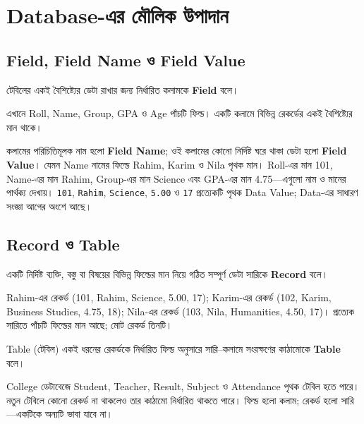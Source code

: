 \section{Database-এর মৌলিক উপাদান}
\subsection{Field, Field Name ও Field Value}
\begin{definitionbox}{}
টেবিলের একই বৈশিষ্ট্যের ডেটা রাখার জন্য নির্ধারিত কলামকে \textbf{Field} বলে।
\end{definitionbox}


এখানে Roll, Name, Group, GPA ও Age পাঁচটি ফিল্ড। একটি কলামে বিভিন্ন রেকর্ডের একই বৈশিষ্ট্যের মান থাকে।

কলামের পরিচিতিমূলক নাম হলো \textbf{Field Name}; ওই কলামের কোনো নির্দিষ্ট ঘরে থাকা ডেটা হলো \textbf{Field Value}। যেমন Name নামের ফিল্ডে Rahim, Karim ও Nila পৃথক মান। Roll-এর মান 101, Name-এর মান Rahim, Group-এর মান Science এবং GPA-এর মান 4.75—এগুলো নাম ও মানের পার্থক্য দেখায়। \texttt{101}, \texttt{Rahim}, \texttt{Science}, \texttt{5.00} ও \texttt{17} প্রত্যেকটি পৃথক Data Value; Data-এর সাধারণ সংজ্ঞা আগের অংশে আছে।

\subsection{Record ও Table}
\begin{definitionbox}{}
একটি নির্দিষ্ট ব্যক্তি, বস্তু বা বিষয়ের বিভিন্ন ফিল্ডের মান নিয়ে গঠিত সম্পূর্ণ ডেটা সারিকে \textbf{Record} বলে।
\end{definitionbox}
Rahim-এর রেকর্ড (101, Rahim, Science, 5.00, 17); Karim-এর রেকর্ড (102, Karim, Business Studies, 4.75, 18); Nila-এর রেকর্ড (103, Nila, Humanities, 4.50, 17)। প্রত্যেক সারিতে পাঁচটি ফিল্ডের মান আছে; মোট রেকর্ড তিনটি।

\begin{definitionbox}{Table (টেবিল)}
একই ধরনের রেকর্ডকে নির্ধারিত ফিল্ড অনুসারে সারি–কলামে সংরক্ষণের কাঠামোকে \textbf{Table} বলে।
\end{definitionbox}
College ডেটাবেজে Student, Teacher, Result, Subject ও Attendance পৃথক টেবিল হতে পারে। নতুন টেবিলে কোনো রেকর্ড না থাকলেও তার কাঠামো নির্ধারিত থাকতে পারে। ফিল্ড হলো কলাম; রেকর্ড হলো সারি—একটিকে অন্যটি ভাবা যাবে না।

